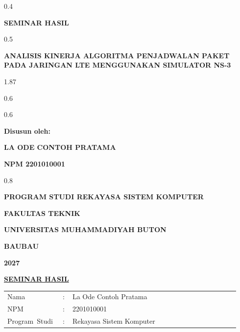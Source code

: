 \thispagestyle{empty}
\begin{ruang}{0.4}\end{ruang}
\begin{sampulbesar}
\textbf{SEMINAR HASIL}
\end{sampulbesar}
\begin{ruang}{0.5}\end{ruang}
\begin{sampulbesar}
\textbf{ANALISIS KINERJA ALGORITMA PENJADWALAN PAKET PADA JARINGAN LTE MENGGUNAKAN SIMULATOR NS-3}
\end{sampulbesar}
\begin{ruang}{1.87}\end{ruang}
\begin{ruang}{0.6}\end{ruang}
\begin{tengah}
\logo{4.5cm}
\end{tengah}
\begin{ruang}{0.6}\end{ruang}
\begin{sampulsedang}
\textbf{Disusun oleh:}

\textbf{LA ODE CONTOH PRATAMA}

\textbf{NPM 2201010001}
\end{sampulsedang}
\begin{ruang}{0.8}\end{ruang}
\begin{sampulsedang}
\textbf{PROGRAM STUDI REKAYASA SISTEM KOMPUTER}

\textbf{FAKULTAS TEKNIK}

\textbf{UNIVERSITAS MUHAMMADIYAH BUTON}

\textbf{BAUBAU}

\textbf{2027}
\end{sampulsedang}
\begin{halamanbaru}\end{halamanbaru}

\thispagestyle{empty}
\begin{tengah}
\textbf{\underline{SEMINAR HASIL}}
\end{tengah}

\begin{tanpagaris}
\begin{longtable}{@{}p{0.22\linewidth}p{0.04\linewidth}p{0.68\linewidth}@{}}
Nama & : & La Ode Contoh Pratama \\[6pt]
NPM & : & 2201010001 \\[6pt]
\mbox{Program Studi} & : & Rekayasa Sistem Komputer \\
\end{longtable}
\end{tanpagaris}

